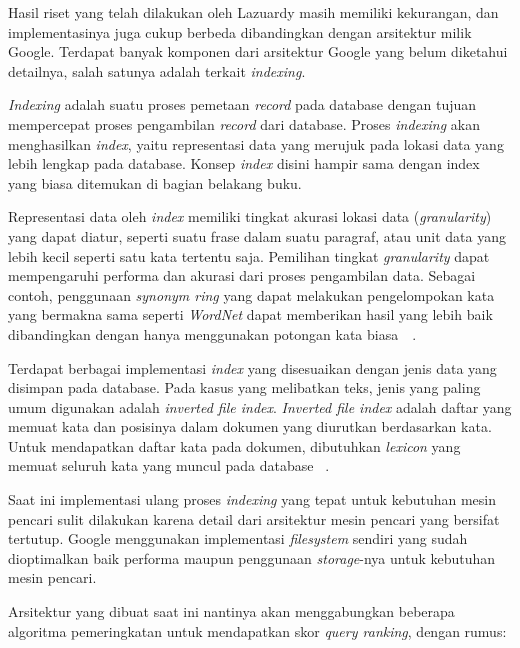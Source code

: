 Hasil riset yang telah dilakukan oleh Lazuardy masih memiliki kekurangan, dan
implementasinya juga cukup berbeda dibandingkan dengan arsitektur milik Google.
Terdapat banyak komponen dari arsitektur Google yang belum diketahui detailnya,
salah satunya adalah terkait \emph{indexing}.

\emph{Indexing} adalah suatu proses pemetaan \emph{record} pada database dengan
tujuan mempercepat proses pengambilan \emph{record} dari database. Proses
\emph{indexing} akan menghasilkan \emph{index}, yaitu representasi data yang
merujuk pada lokasi data yang lebih lengkap pada database. Konsep \emph{index}
disini hampir sama dengan index yang biasa ditemukan di bagian belakang buku.

Representasi data oleh \emph{index} memiliki tingkat akurasi lokasi data
(\emph{granularity}) yang dapat diatur, seperti suatu frase dalam suatu
paragraf, atau unit data yang lebih kecil seperti satu kata tertentu saja.
Pemilihan tingkat \emph{granularity} dapat mempengaruhi performa dan akurasi
dari proses pengambilan data. Sebagai contoh, penggunaan \emph{synonym ring}
yang dapat melakukan pengelompokan kata yang bermakna sama seperti
\emph{WordNet} dapat memberikan hasil yang lebih baik dibandingkan dengan hanya
menggunakan potongan kata biasa~~\cite{gonzalo1998wordnet}.

Terdapat berbagai implementasi \emph{index} yang disesuaikan dengan jenis data
yang disimpan pada database. Pada kasus yang melibatkan teks, jenis yang paling
umum digunakan adalah \emph{inverted file index}. \emph{Inverted file index}
adalah daftar yang memuat kata dan posisinya dalam dokumen yang diurutkan
berdasarkan kata.  Untuk mendapatkan daftar kata pada dokumen, dibutuhkan
\emph{lexicon} yang memuat seluruh kata yang muncul pada database
~\cite{hersh2001gigabytes}.

Saat ini implementasi ulang proses \emph{indexing} yang tepat untuk kebutuhan
mesin pencari sulit dilakukan karena detail dari arsitektur mesin pencari yang
bersifat tertutup. Google menggunakan implementasi \emph{filesystem} sendiri
yang sudah dioptimalkan baik performa maupun penggunaan \emph{storage}-nya
untuk kebutuhan mesin pencari.

Arsitektur yang dibuat saat ini nantinya akan menggabungkan beberapa algoritma
pemeringkatan untuk mendapatkan skor \emph{query ranking}, dengan rumus:

